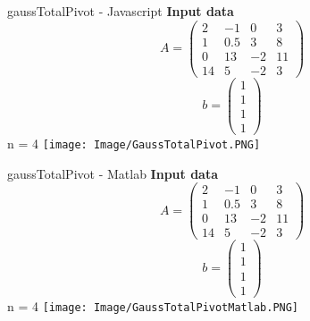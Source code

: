 \documentclass{article}
\begin{document}
\begin{section}{gaussTotalPivot - Javascript}
   \textbf{Input data}\newline
    \[A=\begin{pmatrix}
        2 & -1 & 0 & 3\\
        1 & 0.5 & 3 & 8\\
        0 & 13 & -2 & 11\\
        14 & 5 & -2 & 3
    \end{pmatrix}\]
    \[b=\begin{pmatrix}
        1\\
        1\\
        1\\
        1
    \end{pmatrix}\]
    n = 4\newline\newline
    \texttt{[image: Image/GaussTotalPivot.PNG]}
\end{section}
\begin{section}{gaussTotalPivot - Matlab}
   \textbf{Input data}\newline
    \[A=\begin{pmatrix}
        2 & -1 & 0 & 3\\
        1 & 0.5 & 3 & 8\\
        0 & 13 & -2 & 11\\
        14 & 5 & -2 & 3
    \end{pmatrix}\]
    \[b=\begin{pmatrix}
        1\\
        1\\
        1\\
        1
    \end{pmatrix}\]
    n = 4\newline\newline
    \texttt{[image: Image/GaussTotalPivotMatlab.PNG]}
\end{section}
\end{document}
